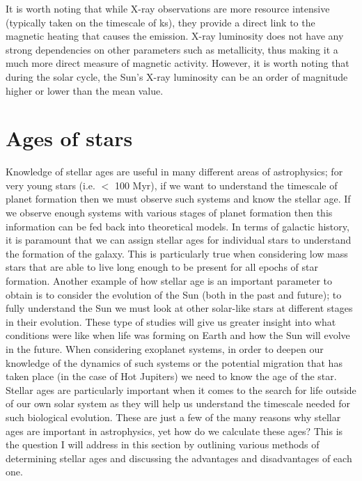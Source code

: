 It is worth noting that while X-ray observations are more resource intensive (typically taken on the timescale of ks), they provide a direct link to the magnetic heating that causes the emission. X-ray luminosity does not have any strong dependencies on other parameters such as metallicity, thus making it a much more direct measure of magnetic activity. However, it is worth noting that during the solar cycle, the Sun's X-ray luminosity can be an order of magnitude higher or lower than the mean value.

\section{Ages of stars}
\label{Section:intro_ages}
Knowledge of stellar ages are useful in many different areas of astrophysics; for very young stars (i.e. $<$ 100 Myr), if we want to understand the timescale of planet formation then we must observe such systems and know the stellar age. If we observe enough systems with various stages of planet formation then this information can be fed back into theoretical models. In terms of galactic history, it is paramount that we can assign stellar ages for individual stars to understand the formation of the galaxy. This is particularly true when considering low mass stars that are able to live long enough to be present for all epochs of star formation. Another example of how stellar age is an important parameter to obtain is to consider the evolution of the Sun (both in the past and future); to fully understand the Sun we must look at other solar-like stars at different stages in their evolution. These type of studies will give us greater insight into what conditions were like when life was forming on Earth and how the Sun will evolve in the future. When considering exoplanet systems, in order to deepen our knowledge of the dynamics of such systems or the potential migration that has taken place (in the case of Hot Jupiters) we need to know the age of the star. Stellar ages are particularly important when it comes to the search for life outside of our own solar system as they will help us understand the timescale needed for such biological evolution. These are just a few of the many reasons why stellar ages are important in astrophysics, yet how do we calculate these ages? This is the question I will address in this section by outlining various methods of determining stellar ages and discussing the advantages and disadvantages of each one.

